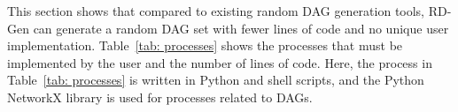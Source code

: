 This section shows that compared to existing random DAG generation tools, RD-Gen can generate a random DAG set with fewer lines of code and no unique user implementation.
Table~\ref{tab: processes} shows the processes that must be implemented by the user and the number of lines of code.
Here, the process in Table~\ref{tab: processes} is written in Python and shell scripts, and the Python NetworkX library is used for processes related to DAGs.


\begin{table}[tb]
    \centering
    \caption{Effort required to generate random DAG sets \\ for {\it Case Study 1} \cite{subbaraj2020multi, liu2016minimizing, sheikh2016sixteen}}
    \label{tab: eval_case_study_single}
    \renewcommand{\arraystretch}{1.2}
\end{table}



